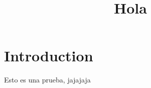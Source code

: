 \documentclass[]{article}
\title{Hola}
\begin{document}
    \section{Introduction}
    Esto es una prueba, jajajaja
\end{document}
